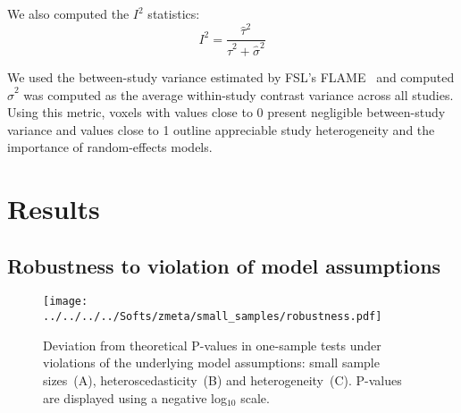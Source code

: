 \documentclass[preprint]{elsarticle}
\newcommand{\varBetween}{\tau^2}
\newcommand{\estvarBetween}{\hat\tau^2}
\newcommand{\nSubjects}[1][i]{n_{#1}}
\begin{document}
We also computed the $I^2$ statistics:
\begin{equation}
	I^2 = \frac{\estvarBetween}{\estvarBetween + \hat \sigma^2}
\end{equation}

We used the between-study variance estimated by FSL's FLAME~\cite{Smith2001} and computed $\hat \sigma^2$ was computed as the average within-study contrast variance across all studies. Using this metric, voxels with values close to 0 present negligible between-study variance and values close to 1 outline appreciable study heterogeneity and the importance of random-effects models.


\section{Results}\label{sec:results}

\subsection{Robustness to violation of model assumptions}

\begin{figure}[h]
	\centering
 	\texttt{[image: ../../../../Softs/zmeta/small\_samples/robustness.pdf]}
	\caption{Deviation from theoretical P-values in one-sample tests under violations of the underlying model assumptions: small sample sizes~(A), heteroscedasticity~(B) and heterogeneity~(C). P-values are displayed using a negative log$_{10}$ scale.}
	\label{fig:robustness}
\end{figure}


\end{document}
